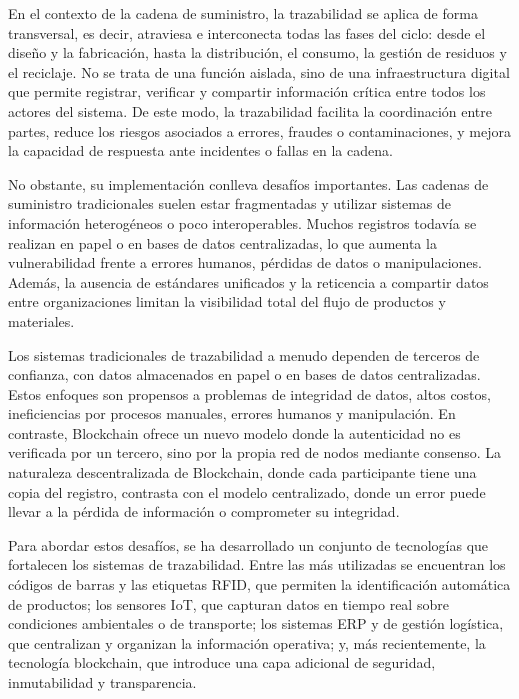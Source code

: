 En el contexto de la cadena de suministro, la trazabilidad se aplica de forma transversal, es decir, atraviesa e interconecta todas las fases del ciclo: desde el diseño y la fabricación, hasta la distribución, el consumo, la gestión de residuos y el reciclaje. No se trata de una función aislada, sino de una infraestructura digital que permite registrar, verificar y compartir información crítica entre todos los actores del sistema. De este modo, la trazabilidad facilita la coordinación entre partes, reduce los riesgos asociados a errores, fraudes o contaminaciones, y mejora la capacidad de respuesta ante incidentes o fallas en la cadena.

No obstante, su implementación conlleva desafíos importantes. Las cadenas de suministro tradicionales suelen estar fragmentadas y utilizar sistemas de información heterogéneos o poco interoperables. Muchos registros todavía se realizan en papel o en bases de datos centralizadas, lo que aumenta la vulnerabilidad frente a errores humanos, pérdidas de datos o manipulaciones. Además, la ausencia de estándares unificados y la reticencia a compartir datos entre organizaciones limitan la visibilidad total del flujo de productos y materiales.

Los sistemas tradicionales de trazabilidad a menudo dependen de terceros de confianza, con datos almacenados en papel o en bases de datos centralizadas. Estos enfoques son propensos a problemas de integridad de datos, altos costos, ineficiencias por procesos manuales, errores humanos y manipulación. En contraste, Blockchain ofrece un nuevo modelo donde la autenticidad no es verificada por un tercero, sino por la propia red de nodos mediante consenso. La naturaleza descentralizada de Blockchain, donde cada participante tiene una copia del registro, contrasta con el modelo centralizado, donde un error puede llevar a la pérdida de información o comprometer su integridad.

Para abordar estos desafíos, se ha desarrollado un conjunto de tecnologías que fortalecen los sistemas de trazabilidad. Entre las más utilizadas se encuentran los códigos de barras y las etiquetas RFID, que permiten la identificación automática de productos; los sensores IoT, que capturan datos en tiempo real sobre condiciones ambientales o de transporte; los sistemas ERP y de gestión logística, que centralizan y organizan la información operativa; y, más recientemente, la tecnología blockchain, que introduce una capa adicional de seguridad, inmutabilidad y transparencia.


